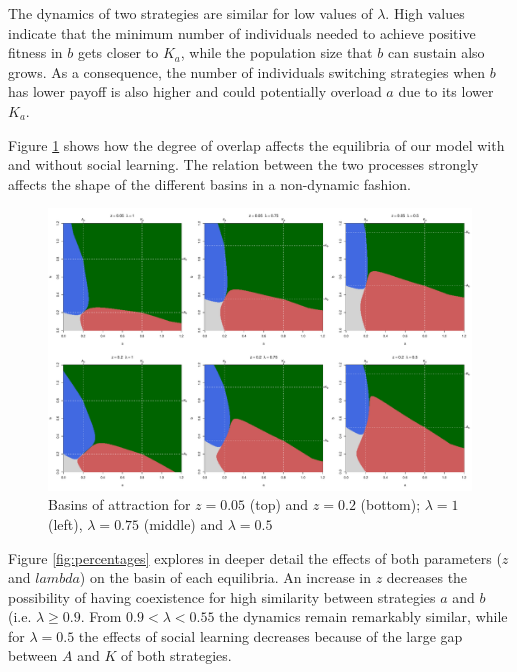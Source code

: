 \documentclass[3p,authoryear,twocolumn]{elsarticle} %
\begin{document}
The dynamics of two strategies are similar for low values of $\lambda$. High values indicate that the minimum number of individuals needed to achieve positive fitness in $b$ gets closer to $K_a$, while the population size that $b$ can sustain also grows. As a consequence, the number of individuals switching strategies when $b$ has lower payoff is also higher and could potentially overload $a$ due to its lower $K_a$.

Figure \ref{fig:overlap} shows how the degree of overlap affects the equilibria of our model with and without social learning. The relation between the two processes strongly affects the shape of the different basins in a non-dynamic fashion.


\begin{figure}[h!]
  \centering
      \includegraphics[width=\textwidth]{./figures/figure5}
  \caption{Basins of attraction for $z=0.05$ (top) and $z=0.2$ (bottom); $\lambda=1$ (left), $\lambda=0.75$ (middle) and $\lambda=0.5$}
    \label{fig:overlap}
\end{figure}

Figure \ref{fig:percentages} explores in deeper detail the effects of both parameters ($z$ and $lambda$) on the basin of each equilibria. An increase in $z$ decreases the possibility of having coexistence for high similarity between strategies $a$ and $b$ (i.e. $\lambda \geq 0.9$. From $0.9 < \lambda < 0.55$ the dynamics remain remarkably similar, while for $\lambda = 0.5$ the effects of social learning decreases because of the large gap between $A$ and $K$ of both strategies.
\end{document}

